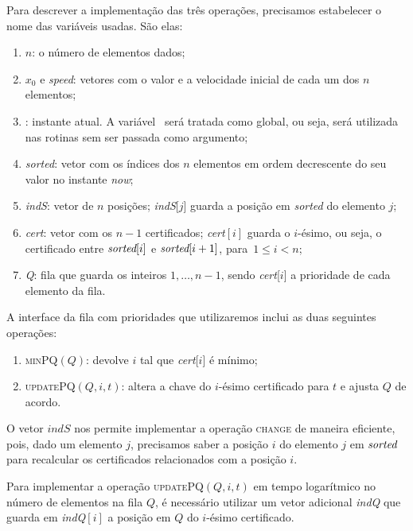 Para descrever a implementação das três operações, precisamos
estabelecer o nome das variáveis usadas. São elas:
\begin{enumerate}
    \item $n$: o número de elementos dados;
    \item $x_0$ e \textit{speed}: vetores com o valor e a velocidade
    inicial de cada um dos $n$ elementos;
    \item \now: instante atual. A variável \now\ será tratada como
    global, ou seja, será utilizada nas rotinas sem ser passada como
    argumento;
    \item \textit{sorted}: vetor com os índices dos $n$ elementos em
    ordem decrescente do seu valor no instante \textit{now};
    \item \textit{indS}: vetor de $n$ posições; \textit{indS}[$j$]
    guarda a posição em \textit{sorted} do elemento $j$;
    \item \textit{cert}: vetor com os $n-1$ certificados;
    \textit{cert}$[i]$ guarda o $i$-ésimo, ou seja, o certificado
    entre $\textit{sorted}[i]$ e ${\textit{sorted}[i+1]}$, para~$1\leq i < n$;
    \item \textit{Q}: fila que guarda os inteiros $1, \dots, n-1$,
    sendo \textit{cert}[$i$] a prioridade de cada elemento da fila.
\end{enumerate}

A interface da fila com prioridades que utilizaremos inclui as duas
seguintes operações:
\begin{enumerate}
    \item \textsc{minPQ}$(Q)$: devolve $i$ tal que
    \textit{cert}[$i$] é mínimo;
    \item \textsc{updatePQ}$(Q, i, t)$: altera a chave do
    $i$-ésimo certificado para $t$ e ajusta $Q$ de acordo.
\end{enumerate}

O vetor $\textit{indS}$ nos permite implementar a operação
\textsc{change} de maneira eficiente, pois, dado um elemento $j$,
precisamos saber a posição $i$ do elemento $j$ em $\textit{sorted}$ para
recalcular os certificados relacionados com a posição $i$.

Para implementar a operação \textsc{updatePQ}$(Q, i, t)$ em tempo
logarítmico no número de elementos na fila $Q$, é necessário
utilizar um vetor adicional \textit{indQ} que guarda em
\textit{indQ}$[i]$ a posição em $Q$ do $i$-ésimo certificado.


